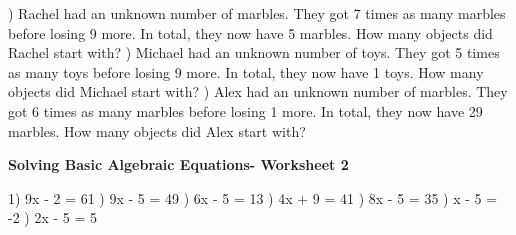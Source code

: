 \documentclass{article}%
\begin{document}
\newline%
\newline%
) Rachel had an unknown number of marbles. They got 7 times as many marbles before losing 9 more. In total, they now have 5 marbles. How many objects did Rachel start with?%
\newline%
\newline%
) Michael had an unknown number of toys. They got 5 times as many toys before losing 9 more. In total, they now have 1 toys. How many objects did Michael start with?%
\newline%
\newline%
) Alex had an unknown number of marbles. They got 6 times as many marbles before losing 1 more. In total, they now have 29 marbles. How many objects did Alex start with?%
\newline%
\newline%
\newline%
\pagebreak%
\large%
\begin{center}%
\textbf{Solving Basic Algebraic Equations- Worksheet 2}%
\newline%
\newline%
\newline%
\end{center} \normalsize%
1) 9x - 2 = 61%
\newline%
\newline%
) 9x - 5 = 49%
\newline%
\newline%
) 6x - 5 = 13%
\newline%
\newline%
) 4x + 9 = 41%
\newline%
\newline%
) 8x - 5 = 35%
\newline%
\newline%
) x - 5 = -2%
\newline%
\newline%
) 2x - 5 = 5%
\newline%
\newline%
\newline%
\end{document}
